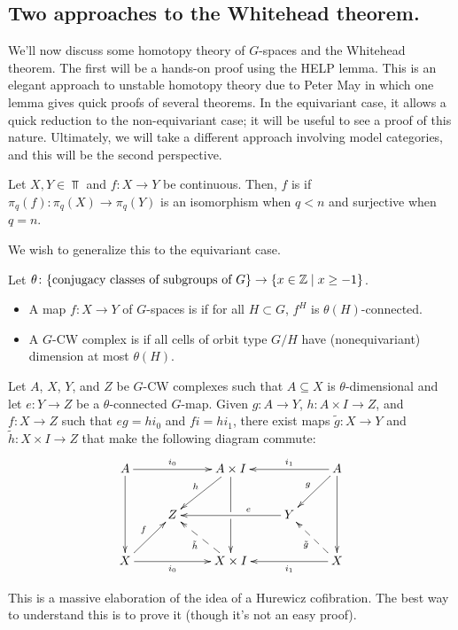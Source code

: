 \subsection*{Two approaches to the Whitehead theorem.}
We'll now discuss some homotopy theory of $G$-spaces and the Whitehead theorem. The first will be a hands-on proof
using the HELP lemma. This is an elegant approach to unstable homotopy theory due to Peter May in which one lemma
gives quick proofs of several theorems. In the equivariant case, it allows a quick reduction to the non-equivariant
case; it will be useful to see a proof of this nature. Ultimately, we will take a different approach involving
model categories, and this will be the second perspective.
\begin{defn}
Let $X,Y\in\Top$ and $f\colon X\to Y$ be continuous. Then, $f$ is  if
$\pi_q(f)\colon\pi_q(X)\to\pi_q(Y)$ is an isomorphism when $q < n$ and surjective when $q = n$.
\end{defn}
We wish to generalize this to the equivariant case.
\begin{defn}
\label{equivariant_connected}
Let $\theta\colon\{\text{conjugacy classes of subgroups of $G$}\}\to\{x\in\mathbb Z\mid x\ge -1\}$.
\begin{itemize}
	\item A map $f\colon X\to Y$ of $G$-spaces is  if for all $H\subset G$, $f^H$ is
	$\theta(H)$-connected.
	\item A $G$-CW complex is  if all cells of orbit type $G/H$ have (nonequivariant)
	dimension at most $\theta(H)$.
\end{itemize}
\end{defn}
\begin{thm}
\label{HELP}
Let $A$, $X$, $Y$, and $Z$ be $G$-CW complexes such that $A\subseteq X$ is $\theta$-dimensional and let $e\colon
Y\to Z$ be a $\theta$-connected $G$-map. Given $g\colon A\to Y$, $h\colon A\times I\to Z$, and $f\colon X\to Z$
such that $eg = hi_0$ and $fi = hi_1$, there exist maps $\tilde g\colon X\to Y$ and $\tilde h\colon X\times I\to Z$
that make the following diagram commute:
\[\xymatrix{
	A \ar[dd] \ar[rr]^-{i_0} && A\times I \ar[dd]|\hole \ar[dl]_-h && \ar[ll]_-{i_1} \ar[dl]_-g A \ar[dd]\\
	& Z && \ar[ll]_(0.35)e Y\\
	X \ar[ur]^-f \ar[rr]_-{i_0} && \ar@{-->}[ul]^-{\tilde h} X\times I && \ar[ll]^-{i_1} \ar@{-->}[ul]^-{\tilde g} X
}\]
\end{thm}
This is a massive elaboration of the idea of a Hurewicz cofibration. The best way to understand this is to prove
it (though it's not an easy proof).

